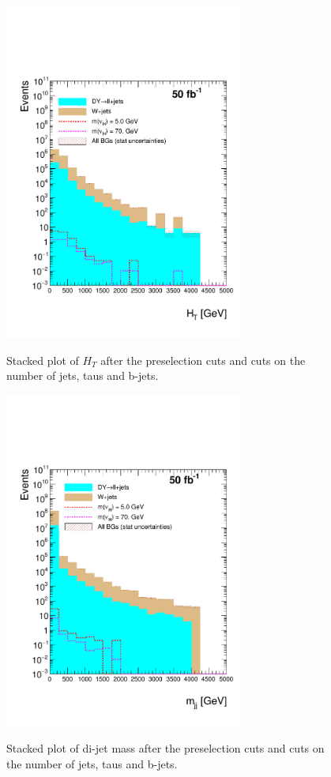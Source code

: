  \begin{figure}[h] 
 \centering
 \caption{Stacked plot of $H_T$ after the preselection cuts and cuts on the number of jets, taus and b-jets.}
 \includegraphics[width=0.7\textwidth]{./Capitulos/Analysis/AfterBJets/HT_MET_20} 
 \label{HT_bjets}
 \end{figure} 
 
  \begin{figure}[h] 
 \centering
 \caption{Stacked plot of di-jet mass after the preselection cuts and cuts on the number of jets, taus and b-jets.}
 \includegraphics[width=0.7\textwidth]{./Capitulos/Analysis/AfterBJets/mjj_MET_20} 
 \label{diJetMass_bjets}
 \end{figure} 
 
